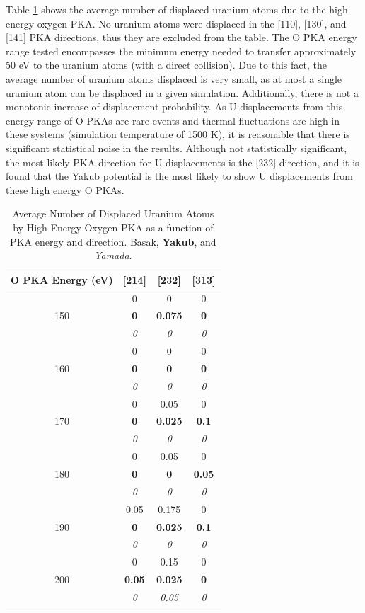 \documentclass[8pt]{article}   	%
\begin{document}
Table \ref{tab:dispU} shows the average number of displaced uranium atoms due to the high energy oxygen PKA. No uranium atoms were displaced in the  [110], [130], and [141] PKA directions, thus they are excluded from the table. The O PKA energy range tested encompasses the minimum energy needed to transfer approximately 50 eV to the uranium atoms (with a direct collision). Due to this fact, the average number of uranium atoms displaced is very small, as at most a single uranium atom can be displaced in a given simulation. Additionally, there is not a monotonic increase of displacement probability. As U displacements from this energy range of O PKAs are rare events and thermal fluctuations are high in these systems (simulation temperature of 1500 K), it is reasonable that there is significant statistical noise in the results. Although not statistically significant, the most likely PKA direction for U displacements is the [232] direction, and it is found that the Yakub potential is the most likely to show U displacements from these high energy O PKAs. 


\begin{table}[H]
	\center
	\begin{tabular}{|c||c|c|c|}
		\hline
		 O PKA Energy (eV) & [214] & [232] & [313]\\
		\hline\hline
		 & 0 & 0 & 0\\
		150 & \textbf{0} & \textbf{0.075} & \textbf{0}\\
		 & \textit{0} & \textit{0} & \textit{0}\\
		\hline
		 & 0 & 0 & 0\\
		160 & \textbf{0} & \textbf{0} & \textbf{0}\\
		 & \textit{0} & \textit{0} & \textit{0}\\
		\hline
		 & 0 & 0.05 & 0\\
       		170 & \textbf{0} & \textbf{0.025} & \textbf{0.1}\\
		 & \textit{0} & \textit{0} & \textit{0}\\
		\hline
		 & 0 & 0.05 & 0\\
      		180 & \textbf{0} & \textbf{0} & \textbf{0.05}\\
		 & \textit{0} & \textit{0} & \textit{0}\\
		\hline
		 & 0.05 & 0.175 & 0\\
       		190 & \textbf{0} & \textbf{0.025} & \textbf{0.1}\\
		 & \textit{0} & \textit{0} & \textit{0}\\
		\hline
		 & 0 & 0.15 & 0\\
       		200 & \textbf{0.05} & \textbf{0.025} & \textbf{0}\\
		 & \textit{0} & \textit{0.05} & \textit{0}\\
		 \hline
	\end{tabular}
	\caption{Average Number of Displaced Uranium Atoms by High Energy Oxygen PKA as a function of PKA energy and direction. Basak, \textbf{Yakub}, and \textit{Yamada}.}
	\label{tab:dispU}
\end{table}
\end{document}
